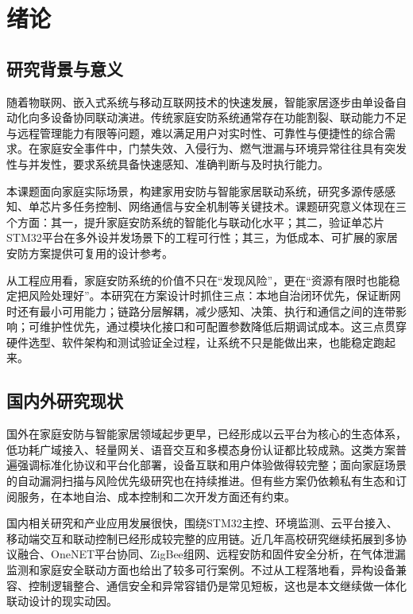 \documentclass[UTF8,12pt,a4paper,oneside]{ctexbook}
\numberwithin{equation}{chapter}
\begin{document}
\chapter{绪论}
\section{研究背景与意义}
随着物联网、嵌入式系统与移动互联网技术的快速发展，智能家居逐步由单设备自动化向多设备协同联动演进\cite{smart_home_survey_2017,home_security_iot_2020}。传统家庭安防系统通常存在功能割裂、联动能力不足与远程管理能力有限等问题，难以满足用户对实时性、可靠性与便捷性的综合需求。在家庭安全事件中，门禁失效、入侵行为、燃气泄漏与环境异常往往具有突发性与并发性，要求系统具备快速感知、准确判断与及时执行能力。

本课题面向家庭实际场景，构建家用安防与智能家居联动系统，研究多源传感感知、单芯片多任务控制、网络通信与安全机制等关键技术。课题研究意义体现在三个方面：其一，提升家庭安防系统的智能化与联动化水平；其二，验证单芯片STM32平台在多外设并发场景下的工程可行性；其三，为低成本、可扩展的家居安防方案提供可复用的设计参考。

从工程应用看，家庭安防系统的价值不只在“发现风险”，更在“资源有限时也能稳定把风险处理好”。本研究在方案设计时抓住三点：本地自治闭环优先，保证断网时还有最小可用能力；链路分层解耦，减少感知、决策、执行和通信之间的连带影响；可维护性优先，通过模块化接口和可配置参数降低后期调试成本。这三点贯穿硬件选型、软件架构和测试验证全过程，让系统不只是能做出来，也能稳定跑起来。
\section{国内外研究现状}
国外在家庭安防与智能家居领域起步更早，已经形成以云平台为核心的生态体系，低功耗广域接入、轻量网关、语音交互和多模态身份认证都比较成熟\cite{smart_home_survey_2017,bozorgi2026_iot_arch,serepas2025_gateway,alkanan2026_biometric}。这类方案普遍强调标准化协议和平台化部署，设备互联和用户体验做得较完整；面向家庭场景的自动漏洞扫描与风险优先级研究也在持续推进\cite{rivas2026_vulnerability}。但有些方案仍依赖私有生态和订阅服务，在本地自治、成本控制和二次开发方面还有约束。

国内相关研究和产业应用发展很快，围绕STM32主控、环境监测、云平台接入、移动端交互和联动控制已经形成较完整的应用链\cite{lian2025_trend,wang2024_stm32_linkage,yue2022_stm32_iot_home,cai2023_stm32f103_control}。近几年高校研究继续拓展到多协议融合、OneNET平台协同、ZigBee组网、远程安防和固件安全分析\cite{wang2024_home_security_wireless,ji2024_stm32_zigbee,chen2023_onenet_ai,zhang2022_firmware_security}，在气体泄漏监测和家庭安全联动方面也给出了较多可行案例\cite{yusuf2026_gas_leakage,dong2024_env_monitor}。不过从工程落地看，异构设备兼容、控制逻辑整合、通信安全和异常容错仍是常见短板，这也是本文继续做一体化联动设计的现实动因。
\end{document}
